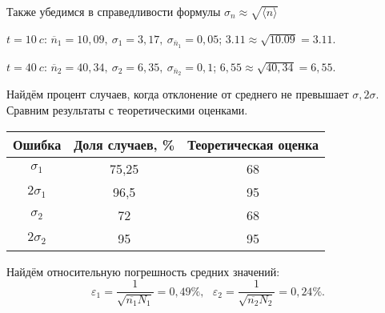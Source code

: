 \documentclass[a4paper]{article}
\begin{document}
Также убедимся в справедливости формулы $\sigma_{n} \approx \sqrt{\langle n \rangle}$  

$t = 10 \: c$: $\overline n_1 = 10,09, \:\sigma_{1} = 3,17 ,\: \sigma_{\overline n_1} = 0,05$; $3.11 \approx \sqrt{10.09} = 3.11$.
		\par
		$t = 40 \: c$: $\overline n_2 = 40,34, \:\sigma_{2} = 6,35, \: \sigma_{\overline n_2} = 0,1$; $6,55 \approx \sqrt{40,34} = 6,55$.
		\item Найдём процент случаев, когда отклонение от среднего не превышает $\sigma, 2\sigma$. Сравним результаты с теоретическими оценками.
		\begin{center}
			\begin{tabular}{|c|c|c|}
				\hline
				Ошибка & Доля случаев, \% & Теоретическая оценка \\\hline
				$\sigma_1$ & 75,25 & 68\\\hline
				$2\sigma_1$ & 96,5 & 95\\\hline \hline
				$\sigma_2$ & 72 & 68\\\hline
				$2\sigma_2$ & 95 & 95\\\hline 
			\end{tabular}    
		\end{center}
		\item  Найдём относительную погрешность средних значений:
		\[ \varepsilon_1 = \frac{1}{\sqrt{\overline{n_1}N_1}} = 0,49 \%, \:\:\: \varepsilon_2 = \frac{1}{\sqrt{\overline{n_2}N_2}} = 0,24 
        \%.\]
\end{document}
